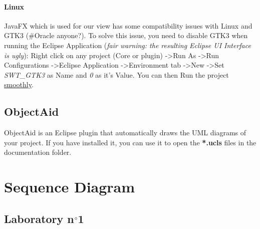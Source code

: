\documentclass{report}
\begin{document}
\subsubsection{Linux}
JavaFX which is used for our view has some compatibility issues with Linux and GTK3 (\#Oracle anyone?). To solve this issue, you need to disable GTK3 when running the Eclipse Application (\textit{fair warning: the resulting Eclipse UI Interface is ugly}): Right click on any project (Core or plugin) -\textgreater Run As -\textgreater Run Configurations -\textgreater Eclipse Application -\textgreater Environment tab -\textgreater New -\textgreater Set \textit{SWT\_GTK3} as Name and \textit{0} as it's Value. You can then Run the project \href{http://i.imgur.com/l9EHHWA.gif}{smoothly}.

\section{ObjectAid}
ObjectAid is an Eclipse plugin that automatically draws the UML diagrams of your project. If you have installed it, you can use it to open the \textbf{*.ucls} files in the documentation folder.
\chapter{Sequence Diagram}

\section{Laboratory n$\degree$1}
\end{document}
